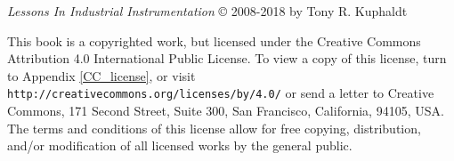 

\textsl{Lessons In Industrial Instrumentation} \copyright{} 2008-2018 by Tony R. Kuphaldt

\vskip 10pt

This book is a copyrighted work, but licensed under the Creative Commons Attribution 4.0 International Public License.  To view a copy of this license, turn to Appendix \ref{CC_license}, or visit \texttt{http://creativecommons.org/licenses/by/4.0/} or send a letter to Creative Commons, 171 Second Street, Suite 300, San Francisco, California, 94105, USA.  The terms and conditions of this license allow for free copying, distribution, and/or modification of all licensed works by the general public.

\vskip 20pt

